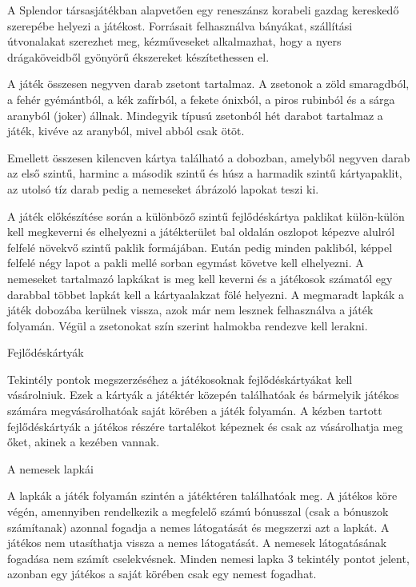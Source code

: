 
A Splendor társasjátékban alapvetően egy reneszánsz korabeli gazdag kereskedő szerepébe helyezi a játékost.
Forrásait felhasználva bányákat, szállítási útvonalakat szerezhet meg, kézműveseket
alkalmazhat, hogy a nyers drágaköveidből gyönyörű ékszereket készítethessen el.\par

A játék összesen negyven darab zsetont tartalmaz. A zsetonok a zöld smaragdból, a fehér gyémántból, a kék zafírból, a fekete ónixból, a piros rubinból és a sárga aranyból (joker) állnak. Mindegyik típusú zsetonból hét darabot tartalmaz a játék, kivéve az aranyból, mivel abból csak ötöt.\par

Emellett összesen kilencven kártya található a dobozban, amelyből negyven darab az első szintű, harminc a második szintű és húsz a harmadik szintű kártyapaklit, az utolsó tíz darab pedig a nemeseket ábrázoló lapokat teszi ki.\par

A játék előkészítése során a különböző szintű fejlődéskártya paklikat külön-külön kell megkeverni és elhelyezni a játékterület bal oldalán oszlopot képezve alulról felfelé növekvő szintű paklik formájában.
Eután pedig minden pakliból, képpel felfelé négy lapot a pakli mellé sorban
egymást követve kell elhelyezni.
A nemeseket tartalmazó lapkákat is meg kell keverni és a játékosok számatól egy darabbal többet lapkát kell a kártyaalakzat fölé helyezni. A megmaradt lapkák a játék dobozába kerülnek vissza, azok már nem lesznek
felhasználva a játék folyamán. Végül a zsetonokat szín szerint halmokba rendezve kell lerakni.\par

Fejlődéskártyák\par
Tekintély pontok megszerzéséhez a játékosoknak fejlődéskártyákat kell vásárolniuk. Ezek a kártyák a játéktér közepén találhatóak és bármelyik játékos számára megvásárolhatóak saját körében a játék folyamán. A kézben tartott fejlődéskártyák a játékos részére tartalékot képeznek és csak az vásárolhatja meg őket, akinek a kezében vannak.\par

A nemesek lapkái\par
A lapkák a játék folyamán szintén a játéktéren találhatóak meg. A játékos köre végén, amennyiben rendelkezik a megfelelő számú bónusszal (csak a bónuszok számítanak) azonnal fogadja a nemes látogatását és megszerzi azt a lapkát. A játékos nem utasíthatja vissza a nemes látogatását. A nemesek látogatásának fogadása nem számít cselekvésnek. Minden nemesi lapka 3 tekintély pontot jelent, azonban egy játékos a saját körében csak egy nemest fogadhat.\par

